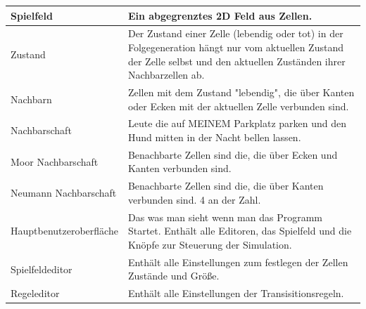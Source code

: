 \documentclass[11pt,a4paper]{article}
\begin{document}
\begin{longtable}[m]{|m{8cm}|m{8cm}|}
 \hline
 Spielfeld & Ein abgegrenztes 2D Feld aus Zellen. \\
 \hline
 Zustand & Der Zustand einer Zelle (lebendig oder tot) in der Folgegeneration hängt nur vom aktuellen Zustand der Zelle selbst und den aktuellen Zuständen ihrer Nachbarzellen ab. \\
 \hline
 Nachbarn & Zellen mit dem Zustand "lebendig", die über Kanten oder Ecken mit der aktuellen Zelle verbunden sind.\\ 
 \hline
 Nachbarschaft & Leute die auf MEINEM Parkplatz parken und den Hund mitten in der Nacht bellen lassen.\\
 \hline
 Moor Nachbarschaft &Benachbarte Zellen sind die, die über Ecken und Kanten verbunden sind.\\
 \hline
 Neumann Nachbarschaft &Benachbarte Zellen sind die, die über Kanten verbunden sind. 4 an der Zahl.\\
 \hline
 Hauptbenutzeroberfläche & Das was man sieht wenn man das Programm Startet. Enthält alle Editoren, das Spielfeld und die Knöpfe zur Steuerung der Simulation.\\
 \hline
 Spielfeldeditor & Enthält alle Einstellungen zum festlegen der Zellen Zustände und Größe. \\
 \hline
 Regeleditor & Enthält alle Einstellungen der Transisitionsregeln.\\
 \hline



\end{longtable}
\end{document}
